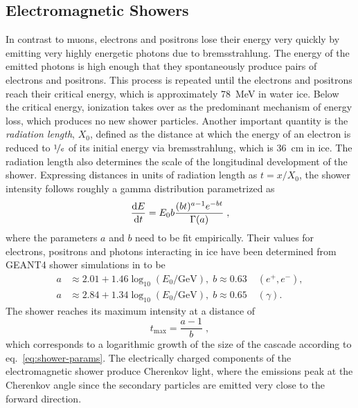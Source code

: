 \subsection{Electromagnetic Showers}
\label{sec:em-showers}
In contrast to muons, electrons and positrons lose their energy very quickly by emitting very highly energetic photons due to bremsstrahlung. The energy of the emitted photons is high enough that they spontaneously produce pairs of electrons and positrons. This process is repeated until the electrons and positrons reach their critical energy, which is approximately 78~MeV in water ice. Below the critical energy, ionization takes over as the predominant mechanism of energy loss, which produces no new shower particles. Another important quantity is the \emph{radiation length}, $X_0$, defined as the distance at which the energy of an electron is reduced to $\nicefrac{1}{e}$ of its initial energy via bremsstrahlung, which is 36~cm in ice\cite{pdg}. The radiation length also determines the scale of the longitudinal development of the shower. Expressing distances in units of radiation length as $t=x/X_0$, the shower intensity follows roughly a gamma distribution parametrized as
\begin{equation}
    \frac{\mathrm{d} E}{\mathrm{d} t} = E_0 b \frac{(bt)^{a-1}e^{-bt}}{\Gamma(a)}\;,
\end{equation}
where the parameters $a$ and $b$ need to be fit empirically\cite{pdg}. Their values for electrons, positrons and photons interacting in ice have been determined from GEANT4 shower simulations in to be
\begin{align}
    a &\approx 2.01 + 1.46 \log_{10}(E_0/\mathrm{GeV}),\; b\approx 0.63\; & (e^+,e^-), \\
    a &\approx 2.84 + 1.34 \log_{10}(E_0/\mathrm{GeV}),\; b\approx 0.65\; & (\gamma).\label{eq:shower-params}
\end{align}
The shower reaches its maximum intensity at a distance of
\begin{equation}
    t_{\mathrm{max}}=\frac{a-1}{b}\;,
\end{equation}
which corresponds to a logarithmic growth of the size of the cascade according to eq.~\ref{eq:shower-params}. The electrically charged components of the electromagnetic shower produce Cherenkov light, where the emissions peak at the Cherenkov angle since the secondary particles are emitted very close to the forward direction.

